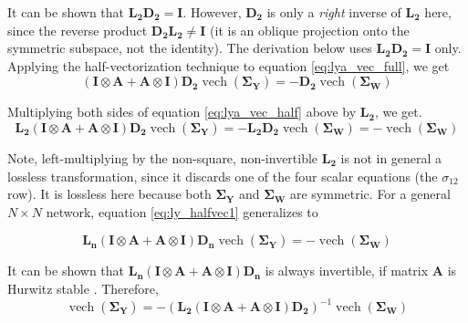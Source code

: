 \documentclass{article}
\begin{document}
It can be shown that $\mathbf{L_2} \mathbf{D_2} = \mathbf{I}$. However, $\mathbf{D_2}$ is only a \emph{right} inverse of $\mathbf{L_2}$ here, since the reverse product $\mathbf{D_2}\mathbf{L_2}\neq\mathbf{I}$ (it is an oblique projection
onto the symmetric subspace, not the identity). The derivation below uses
$\mathbf{L_2}\mathbf{D_2}=\mathbf{I}$ only.
Applying the half-vectorization technique to equation \ref{eq:lya_vec_full}, we get
\begin{equation}
(\mathbf{I} \otimes \mathbf{A} + \mathbf{A} \otimes \mathbf{I}) \mathbf{D_2} \operatorname{vech}(\boldsymbol{\Sigma}_\mathbf{Y}) = -\mathbf{D_2} \operatorname{vech}(\mathbf{\Sigma}_\mathbf{W})
\label{eq:lya_vec_half}
\end{equation}

Multiplying both sides of equation \ref{eq:lya_vec_half} above by $\mathbf{L_2}$, we get.
\begin{equation}
\mathbf{L_2}(\mathbf{I} \otimes \mathbf{A} + \mathbf{A} \otimes \mathbf{I}) \mathbf{D_2} \operatorname{vech}(\boldsymbol{\Sigma}_\mathbf{Y}) = -\mathbf{L_2} \mathbf{D_2} \operatorname{vech}(\mathbf{\Sigma}_\mathbf{W})
=-\operatorname{vech}(\mathbf{\Sigma}_\mathbf{W})
\label{eq:ly_halfvec1}
\end{equation}

Note, left-multiplying by the non-square, non-invertible $\mathbf{L_2}$ is not in general a lossless transformation, since it discards one of the four scalar equations
(the $\sigma_{12}$ row). It is lossless here because both $\boldsymbol{\Sigma}_\mathbf{Y}$ and $\mathbf{\Sigma}_\mathbf{W}$ are symmetric. For a general $N\times N$ network, equation
\ref{eq:ly_halfvec1} generalizes \citep{MagnusNeudecker1999} to

\begin{equation}
\mathbf{L_n} (\mathbf{I} \otimes \mathbf{A} + \mathbf{A} \otimes \mathbf{I}) \mathbf{D_n} \operatorname{vech}(\boldsymbol{\Sigma}_\mathbf{Y}) =-\operatorname{vech}(\mathbf{\Sigma}_\mathbf{W})
\label{eq:ly_halfvec1_nbyn}
\end{equation}

It can be shown that $\mathbf{L_n}(\mathbf{I} \otimes \mathbf{A} + \mathbf{A} \otimes \mathbf{I}) \mathbf{D_n}$ is always invertible, if matrix $\mathbf{A}$ is Hurwitz stable \citep{Antsaklis1997}. Therefore,
\begin{equation}
    \operatorname{vech} (\boldsymbol{\Sigma}_\mathbf{Y})=
    -\left (\mathbf{L_2}(\mathbf{I} \otimes \mathbf{A} + \mathbf{A} \otimes \mathbf{I}) \mathbf{D_2} \right )^{-1}\operatorname{vech}(\boldsymbol{\Sigma}_\mathbf{W})
\label{eq:lya_vec_half1}
\end{equation}
\end{document}
